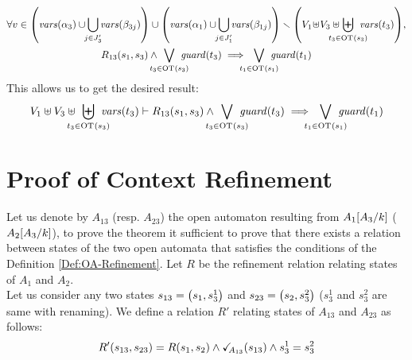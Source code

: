 \documentclass[runningheads]{llncs}
\begin{document}
\begin{enumerate}
\begin{multline*}
\everymath{\displaystyle}
\forall v\in \mpar{\fvars{\alpha_{3}}  \cup \!\!\bigcup_{j \in J'_{3}} \!\!\fvars{\beta_{3j}}} \cup \mpar{\fvars{\alpha_{1}}  \cup\!\! \bigcup_{j \in J'_{1}} \!\!\fvars{\beta_{1j}}}
 \setminus \mpar{V_1\! \uplus\!V_3 \uplus\!\! \biguplus_\subbox{t_3 \in \fOT{s_3}} \fvars{t_3}},\\
R_{13}\mpar{s_1,s_3} \wedge \bigvee_\subbox{t_3 \in \fOT{s_3}} \fguard{t_3}
\implies \bigvee_\subbox{t_1 \in \fOT{s_1}} \fguard{t_1}
\end{multline*}
This allows us to get the desired result:
\begin{multline*}
V_1 \uplus V_3 \uplus \biguplus_\subbox{t_3 \in \fOT{s_3}} \fvars{t_3}
\vdash R_{13}\mpar{s_1,s_3} \wedge \bigvee_\subbox{t_3 \in \fOT{s_3}} \fguard{t_3}
\implies \bigvee_\subbox{t_1 \in \fOT{s_1}} \fguard{t_1}
\end{multline*}

\end{enumerate}

\section{Proof of Context Refinement}
Let us denote by $A_{13}$ (resp. $A_{23}$) the open automaton resulting from $A_1{\left[A_3\middle/k\right]}$ ($A_2{\left[A_3\middle/k\right]}$),  to prove the theorem it sufficient to prove that there exists a relation between states of the two open automata that satisfies the conditions of the Definition \ref{Def:OA-Refinement}. Let $R$ be the refinement relation relating states of $A_1$ and $A_2$.\\
Let us consider any two states $s_{13} = {\left(s_1,s^1_3\right)}$ and $s_{23} = {\left(s_2,s^2_3\right)}$ ($s^1_3$ and $s^2_3$  are same with renaming). We define a relation $R'$ relating states of $A_{13}$ and $A_{23}$ as follows:
\[ R' {\left(s_{13}, s_{23}\right)} = R{\left(s_{1}, s_{2}\right)} \wedge \checkmark_{\!\! A_{13}}{\left(s_{13}\right)} \wedge s^1_3 = s^2_3\]
\end{document}

